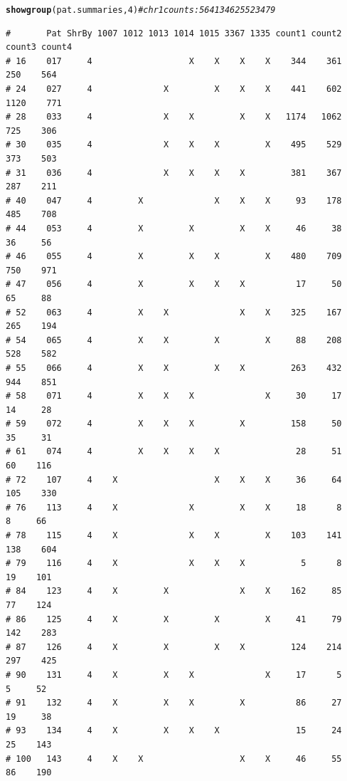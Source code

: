 \documentclass{article}\usepackage[]{graphicx}\usepackage[]{color}
\makeatletter
\newcommand{\hlnum}[1]{\textcolor[rgb]{0.686,0.059,0.569}{#1}}%
\newcommand{\hlcom}[1]{\textcolor[rgb]{0.678,0.584,0.686}{\textit{#1}}}%
\newcommand{\hlstd}[1]{\textcolor[rgb]{0.345,0.345,0.345}{#1}}%
\newcommand{\hlkwd}[1]{\textcolor[rgb]{0.737,0.353,0.396}{\textbf{#1}}}%
\newenvironment{kframe}{%
 \def\at@end@of@kframe{}%
 \ifinner\ifhmode%
  \def\at@end@of@kframe{\end{minipage}}%
  \begin{minipage}{\columnwidth}%
 \fi\fi%
 \def\FrameCommand##1{\hskip\@totalleftmargin \hskip-\fboxsep
 \colorbox{shadecolor}{##1}\hskip-\fboxsep
     \hskip-\linewidth \hskip-\@totalleftmargin \hskip\columnwidth}%
 \MakeFramed {\advance\hsize-\width
   \@totalleftmargin\z@ \linewidth\hsize
   \@setminipage}}%
 {\par\unskip\endMakeFramed%
 \at@end@of@kframe}
\newenvironment{knitrout}{}{} %
\makeatother
\begin{document}
\begin{knitrout}\footnotesize
{}\color{fgcolor}\begin{kframe}
\begin{alltt}
\hlkwd{showgroup}\hlstd{(pat.summaries,}\hlnum{4}\hlstd{)} \hlcom{# chr 1 counts: 564   1346   2552  3479}
\end{alltt}
\begin{verbatim}
#       Pat ShrBy 1007 1012 1013 1014 1015 3367 1335 count1 count2 count3 count4
# 16    017     4                   X    X    X    X    344    361    250    564
# 24    027     4              X         X    X    X    441    602   1120    771
# 28    033     4              X    X         X    X   1174   1062    725    306
# 30    035     4              X    X    X         X    495    529    373    503
# 31    036     4              X    X    X    X         381    367    287    211
# 40    047     4         X              X    X    X     93    178    485    708
# 44    053     4         X         X         X    X     46     38     36     56
# 46    055     4         X         X    X         X    480    709    750    971
# 47    056     4         X         X    X    X          17     50     65     88
# 52    063     4         X    X              X    X    325    167    265    194
# 54    065     4         X    X         X         X     88    208    528    582
# 55    066     4         X    X         X    X         263    432    944    851
# 58    071     4         X    X    X              X     30     17     14     28
# 59    072     4         X    X    X         X         158     50     35     31
# 61    074     4         X    X    X    X               28     51     60    116
# 72    107     4    X                   X    X    X     36     64    105    330
# 76    113     4    X              X         X    X     18      8      8     66
# 78    115     4    X              X    X         X    103    141    138    604
# 79    116     4    X              X    X    X           5      8     19    101
# 84    123     4    X         X              X    X    162     85     77    124
# 86    125     4    X         X         X         X     41     79    142    283
# 87    126     4    X         X         X    X         124    214    297    425
# 90    131     4    X         X    X              X     17      5      5     52
# 91    132     4    X         X    X         X          86     27     19     38
# 93    134     4    X         X    X    X               15     24     25    143
# 100   143     4    X    X                   X    X     46     55     86    190

\end{verbatim}
\end{kframe}
\end{knitrout}
\end{document}
